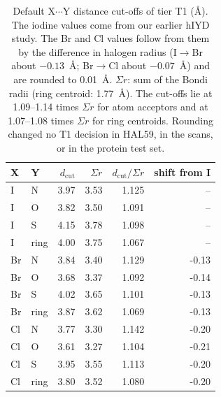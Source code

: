 \begin{table}[!htbp]\centering\small
\caption{Default X$\cdots$Y distance cut-offs of tier T1 (\AA). The iodine values come from our earlier hIYD study.\cite{Karmakar2026} The Br and Cl values follow from them by the difference in halogen radius (I$\to$Br about $-0.13$~\AA; Br$\to$Cl about $-0.07$~\AA) and are rounded to 0.01~\AA. $\Sigma r$: sum of the Bondi radii (ring centroid: 1.77~\AA). The cut-offs lie at 1.09--1.14 times $\Sigma r$ for atom acceptors and at 1.07--1.08 times $\Sigma r$ for ring centroids. Rounding changed no T1 decision in HAL59, in the scans, or in the protein test set.}\label{tab:cutoffs}
\begin{tabular}{llrrrr}\toprule X & Y & $d_\mathrm{cut}$ & $\Sigma r$ & $d_\mathrm{cut}/\Sigma r$ & shift from I \\\midrule
I & N & 3.97 & 3.53 & 1.125 & --\\
I & O & 3.82 & 3.50 & 1.091 & --\\
I & S & 4.15 & 3.78 & 1.098 & --\\
I & ring & 4.00 & 3.75 & 1.067 & --\\
Br & N & 3.84 & 3.40 & 1.129 & -0.13\\
Br & O & 3.68 & 3.37 & 1.092 & -0.14\\
Br & S & 4.02 & 3.65 & 1.101 & -0.13\\
Br & ring & 3.87 & 3.62 & 1.069 & -0.13\\
Cl & N & 3.77 & 3.30 & 1.142 & -0.20\\
Cl & O & 3.61 & 3.27 & 1.104 & -0.21\\
Cl & S & 3.95 & 3.55 & 1.113 & -0.20\\
Cl & ring & 3.80 & 3.52 & 1.080 & -0.20\\
\bottomrule\end{tabular}\end{table}
